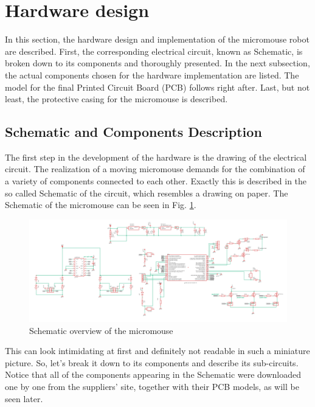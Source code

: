 \section{Hardware design} \label{chap:hardware}

In this section, the hardware design and implementation of the micromouse robot are described. First, the corresponding electrical circuit, known as Schematic, is broken down to its components and thoroughly presented. In the next subsection, the actual components chosen for the hardware implementation are listed. The model for the final Printed Circuit Board (PCB) follows right after. Last, but not least, the protective casing for the micromouse is described.

\vspace{1cm}

\subsection{Schematic and Components Description}

The first step in the development of the hardware is the drawing of the electrical circuit. The realization of a moving micromouse demands for the combination of a variety of components connected to each other. Exactly this is described in the so called Schematic of the circuit, which resembles a drawing on paper. 
The Schematic of the micromouse can be seen in Fig. \ref{fig:schematic_overview}.

\begin{figure}[H]
    \centering
    \includegraphics[width=1\textwidth]{figures/hardware/Schematic.PNG}
    \caption{Schematic overview of the micromouse}
    \label{fig:schematic_overview}
\end{figure}

\noindent
This can look intimidating at first and definitely not readable in such a miniature picture. So, let's break it down to its components and describe its sub-circuits. Notice that all of the components appearing in the Schematic were downloaded one by one from the suppliers' site, together with their PCB models, as will be seen later.

